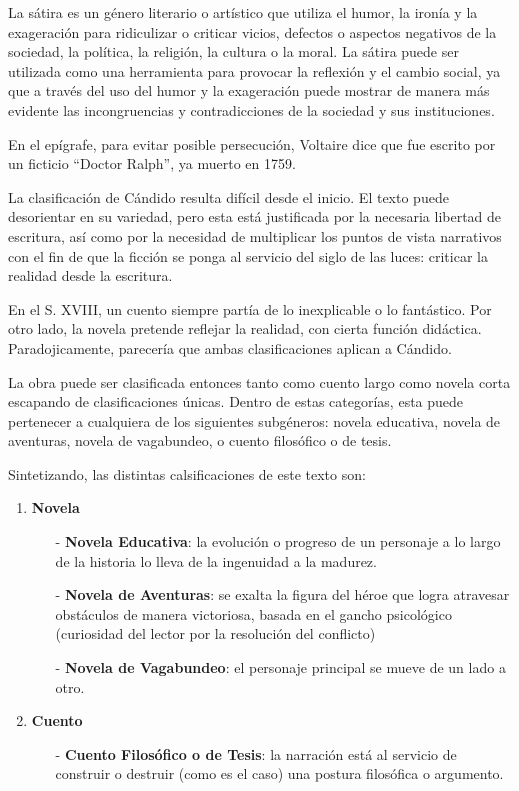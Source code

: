 \documentclass{article}
\begin{document}
La sátira es un género literario o artístico que utiliza el humor, la ironía y la exageración para ridiculizar o criticar vicios, defectos o aspectos negativos de la sociedad, la política, la religión, la cultura o la moral. La sátira puede ser utilizada como una herramienta para provocar la reflexión y el cambio social, ya que a través del uso del humor y la exageración puede mostrar de manera más evidente las incongruencias y contradicciones de la sociedad y sus instituciones.

En el epígrafe, para evitar posible persecución, Voltaire dice que fue escrito por un ficticio ``Doctor Ralph'', ya muerto en 1759.

La clasificación de Cándido resulta difícil desde el inicio. El  texto puede desorientar en su variedad, pero esta está justificada por la necesaria libertad de escritura, así como por la necesidad de multiplicar los puntos de vista narrativos con el fin de que la ficción se ponga al servicio del siglo de las luces: criticar la realidad desde la escritura.

En el S. XVIII, un cuento siempre partía de lo inexplicable o lo fantástico. Por otro lado, la novela pretende reflejar la realidad, con cierta función didáctica. Paradojicamente, parecería que ambas clasificaciones aplican a Cándido.

La obra puede ser clasificada entonces tanto como cuento largo como novela corta escapando de clasificaciones únicas. Dentro de estas categorías, esta puede pertenecer a cualquiera de los siguientes subgéneros: novela educativa, novela de aventuras, novela de vagabundeo, o cuento filosófico o de tesis.

Sintetizando, las distintas calsificaciones de este texto son: 

\begin{enumerate}
    \item \textbf{Novela}
    \begin{itemize}
        \item[-] \textbf{Novela Educativa}: la evolución o progreso de un personaje a lo largo de la historia lo lleva de la ingenuidad a la madurez.
        \item[-] \textbf{Novela de Aventuras}: se exalta la figura del héroe que logra atravesar obstáculos de manera victoriosa, basada en el gancho psicológico (curiosidad del lector por la resolución del conflicto)
        \item[-] \textbf{Novela de Vagabundeo}: el personaje principal se mueve de un lado a otro.
    \end{itemize} 
    \item \textbf{Cuento}
    \begin{itemize}
        \item[-] \textbf{Cuento Filosófico o de Tesis}: la narración está al servicio de construir o destruir (como es el caso) una postura filosófica o argumento.
    \end{itemize} 
\end{enumerate}
\end{document}
